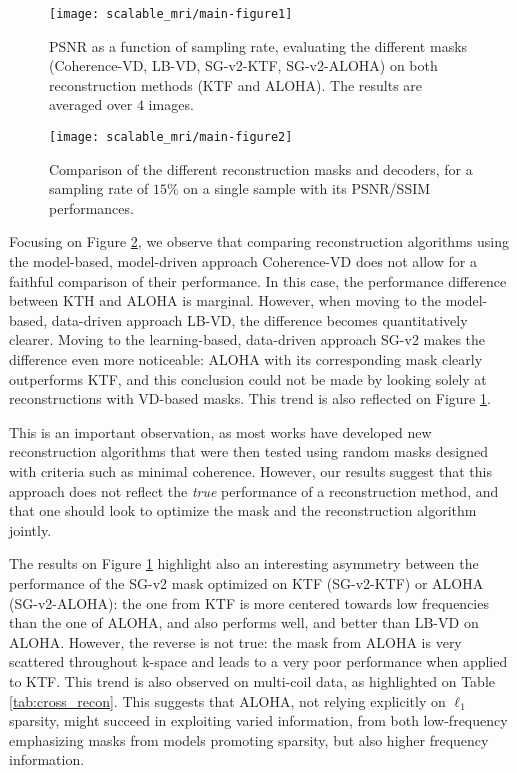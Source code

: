 \begin{figure}[!ht]
    \centering
    \texttt{[image: scalable\_mri/main-figure1]}
    \caption{PSNR as a function of sampling rate, evaluating the different masks (Coherence-VD, LB-VD, SG-v2-KTF, SG-v2-ALOHA) on both reconstruction methods (KTF and ALOHA). The results are averaged over $4$ images.}\label{fig:psnr_cross}
\end{figure}

\begin{figure}[!ht]
    \centering
    \texttt{[image: scalable\_mri/main-figure2]}
    \caption{Comparison of the different reconstruction masks and decoders, for a sampling rate of $15\%$ on a single sample with its PSNR/SSIM performances.}\label{fig:plot_cross}
\end{figure}




Focusing on Figure \ref{fig:plot_cross}, we observe that comparing reconstruction algorithms using the model-based, model-driven approach Coherence-VD does not allow for a faithful comparison of their performance. In this case, the performance difference between KTH and ALOHA is marginal. However, when moving to the model-based, data-driven approach LB-VD, the difference becomes quantitatively clearer. Moving to the learning-based, data-driven approach SG-v2 makes the difference even more noticeable: ALOHA with its corresponding mask clearly outperforms KTF, and this conclusion could not be made by looking solely at reconstructions with VD-based masks. This trend is also reflected on Figure \ref{fig:psnr_cross}. 

This is an important observation, as most works have developed new reconstruction algorithms that were then tested using random masks designed with criteria such as minimal coherence. However, our results suggest that this approach does not reflect the \textit{true} performance of a reconstruction method, and that one should look to optimize the mask and the reconstruction algorithm jointly.

The results on Figure \ref{fig:psnr_cross} highlight also an interesting asymmetry between the performance of the SG-v2 mask optimized on KTF (SG-v2-KTF) or ALOHA (SG-v2-ALOHA): the one from KTF is more centered towards low frequencies than the one of ALOHA, and also performs well, and better than LB-VD on ALOHA. However, the reverse is not true: the mask from ALOHA is very scattered throughout k-space and leads to a very poor performance when applied to KTF. This trend is also observed on multi-coil data, as highlighted on Table \ref{tab:cross_recon}. This suggests that ALOHA, not relying explicitly on $\ell_1$ sparsity, might succeed in exploiting varied information, from both low-frequency emphasizing masks from models promoting sparsity, but also higher frequency information.

